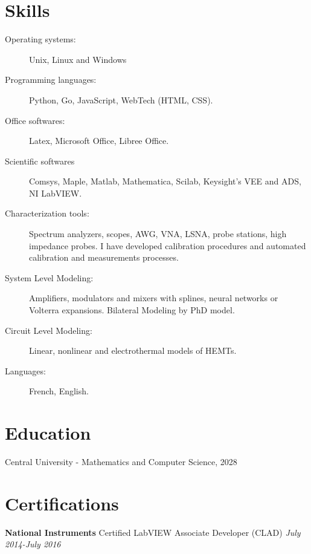 \documentclass[margin,line]{resume}
\begin{document}
\begin{resume}

  \section{\mysidestyle Skills}\vspace{2mm}
  \begin{description}
    \item[Operating systems:] Unix, Linux and Windows
    \item[Programming languages:] Python, Go, JavaScript, WebTech (HTML, CSS).
    \item[Office softwares:] Latex, Microsoft Office, Libree Office.
    \item[Scientific softwares] Comsys, Maple, Matlab, Mathematica,
      Scilab, Keysight's VEE and ADS, NI LabVIEW.
    \item[Characterization tools:] Spectrum analyzers, scopes, AWG,
      VNA, LSNA, probe stations, high impedance probes. I have
      developed calibration procedures and automated calibration and
      measurements processes.
    \item[System Level Modeling:] Amplifiers, modulators and mixers
      with splines, neural networks or Volterra expansions. Bilateral
      Modeling by PhD model.
    \item[Circuit Level Modeling:] Linear, nonlinear and
      electrothermal models of HEMTs.
    \item[Languages:] French, English.
  \end{description}


  \section{\mysidestyle Education}
  Central University - Mathematics and Computer Science, 2028 \\


  \section{\mysidestyle Certifications}
  \textbf{National Instruments} Certified LabVIEW Associate Developer
  (CLAD) \hfill \textsl{July 2014-July 2016}\\



\end{resume}
\end{document}
